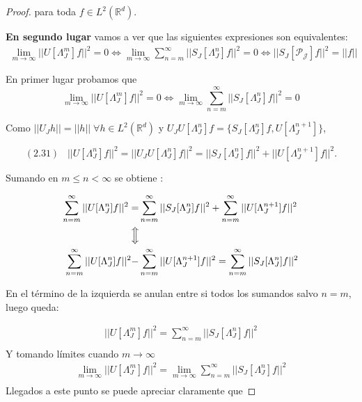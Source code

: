 \begin{proof}
  \noindent para toda $f \in L^2(\mathbb{R}^d)$. 

  \medskip

  \noindent \textbf{En segundo lugar} vamos a ver que las siguientes expresiones son equivalentes: 
  \begin{align*}
    \lim_{m\rightarrow \infty} ||U[\Lambda_J^m]f||^2=0 \iff \lim_{m\rightarrow\infty} \sum_{n=m}^{\infty} ||S_J[\Lambda_J^n]f||^2=0 \iff ||S_J[\mathcal{P_J}]f||^2 = ||f||
  \end{align*}

  En primer lugar probamos que 
  $$\lim_{m\rightarrow \infty} ||U[\Lambda_J^m]f||^2=0 \iff \lim_{m\rightarrow\infty} \sum_{n=m}^{\infty} ||S_J[\Lambda_J^n]f||^2=0$$
  
  \noindent Como $||U_J h||=||h|| \; \forall h \in L^2(\mathbb{R}^d)$ y $U_J U[\Lambda_J^n]f=\lbrace S_J[\Lambda_J^n]f,U[\Lambda_J^{n+1}]\rbrace$,

  $$(2.31) \;\;\; ||U[\Lambda_J^n]f||^2=||U_JU[\Lambda_J^n]f||^2=||S_J[\Lambda_J^n]f||^2+||U[\Lambda_J^{n+1}]f||^2.$$

  \noindent Sumando en $m\leq n < \infty$ se obtiene : 
  
  \begin{align*}
    \sum_{n=m}^\infty ||U[\Lambda_J^n]f||^2=&\sum_{n=m}^\infty ||S_J[\Lambda_J^n]f||^2 + \sum_{n=m}^\infty||U[\Lambda_J^{n+1}]f||^2 \\
    \Big\Updownarrow \\
    \sum_{n=m}^\infty ||U[\Lambda_J^n]f||^2 -& \sum_{n=m}^\infty||U[\Lambda_J^{n+1}]f||^2 =\sum_{n=m}^\infty ||S_J[\Lambda_J^n]f||^2  \\
  \end{align*}
  
  \noindent En el término de la izquierda se anulan entre si todos los sumandos salvo $n=m$, luego queda: 

  \begin{align*}
    ||U[\Lambda_J^m]f||^2 =\sum_{n=m}^\infty ||S_J[\Lambda_J^n]f||^2  \\
  \end{align*}
  \noindent Y tomando límites cuando $m\rightarrow \infty$
  \begin{align*}
    \lim_{m\rightarrow \infty}||U[\Lambda_J^m]f||^2 =\lim_{m\rightarrow \infty}\sum_{n=m}^\infty ||S_J[\Lambda_J^n]f||^2  \\
  \end{align*}
  \noindent Llegados a este punto se puede apreciar claramente que
  

\end{proof}
